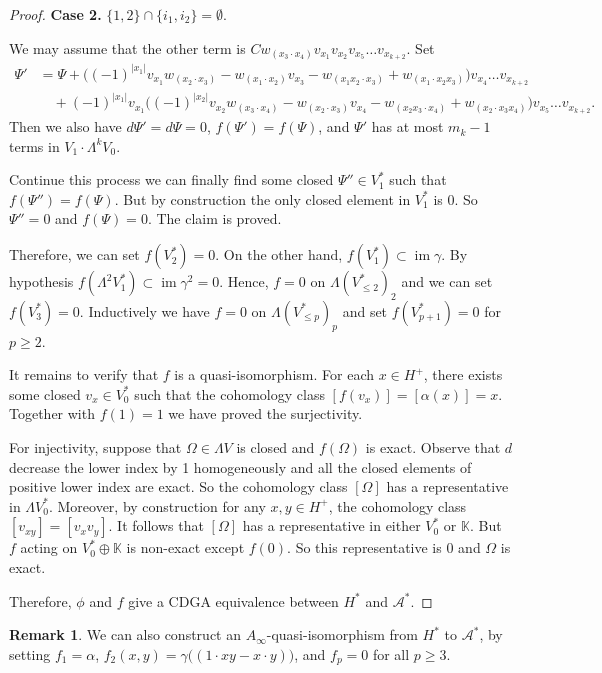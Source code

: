 \documentclass{article}
\theoremstyle{plain}
\theoremstyle{definition}
\newtheorem{rmk}[thm]{Remark}
\theoremstyle{plain}
\DeclareMathOperator{\im}{im}
\numberwithin{equation}{section}
\begin{document}
\begin{proof}
\textbf{Case 2.} $\{1,2\}\cap\{i_1,i_2\}=\emptyset$.

We may assume that the other term is $Cw_{(x_3\cdot x_4)}v_{x_1}v_{x_2}v_{x_5}\ldots v_{x_{k+2}}$. Set
\begin{align*}
\Psi' &= \Psi+\big((-1)^{|x_1|}v_{x_1} w_{({x_2}\cdot {x_3})}-w_{(x_1\cdot x_2)} v_{x_3}-w_{(x_1x_2\cdot x_3)}+w_{(x_1\cdot x_2x_3)}\big)v_{x_4}\ldots v_{x_{k+2}} \\
&\quad +(-1)^{|x_1|}v_{x_1}\big((-1)^{|x_2|}v_{x_2} w_{({x_3}\cdot {x_4})}-w_{(x_2\cdot x_3)} v_{x_4}-w_{(x_2x_3\cdot x_4)}+w_{(x_2\cdot x_3x_4)}\big)v_{x_5}\ldots v_{x_{k+2}}.
\end{align*}
Then we also have $d\Psi'=d\Psi=0$, $f(\Psi')=f(\Psi)$, and $\Psi'$ has at most $m_k-1$ terms in $V_1\cdot\Lambda^k V_0$.

Continue this process we can finally find some closed $\Psi''\in V_1^*$ such that $f(\Psi'')=f(\Psi)$. But by construction the only closed element in $V_1^*$ is 0. So $\Psi''=0$ and $f(\Psi)=0$. The claim is proved.

Therefore, we can set $f(V_2^*)=0$. On the other hand, $f(V_1^*) \subset \im\gamma$. By hypothesis  $f(\Lambda^2 V_1^*)\subset \im\gamma^2=0$. Hence, $f=0$ on $\Lambda(V_{\leq 2}^*)_2$ and we can set $f(V_3^*)=0$. Inductively we have $f=0$ on $\Lambda(V_{\leq p}^*)_p$ and set $f(V_{p+1}^*)=0$ for $p\geq 2$.

It remains to verify that $f$ is a quasi-isomorphism. For each $x\in H^+$, there exists some closed $v_x\in V_0^*$ such that the cohomology class $[f(v_x)]=[\alpha(x)]=x$. Together with $f(1)=1$ we have proved the surjectivity.

For injectivity, suppose that $\Omega\in\Lambda V$ is closed and $f(\Omega)$ is exact. Observe that $d$ decrease the lower index by 1 homogeneously and all the closed elements of positive lower index are exact. So the cohomology class $[\Omega]$ has a representative in $\Lambda V_0^*$. Moreover, by construction for any $x,y\in H^+$, the cohomology class $[v_{xy}]=[v_xv_y]$. It follows that $[\Omega]$ has a representative in either $V_0^*$ or $\mathbb{K}$. But $f$ acting on $V_0^*\oplus\mathbb{K}$ is non-exact except $f(0)$. So this representative is 0 and $\Omega$ is exact.

Therefore, $\phi$ and $f$ give a CDGA equivalence between $H^*$ and $\mathcal{A}^*$. 
\end{proof}

\begin{rmk}
We can also construct an $A_{\infty}$-quasi-isomorphism from $H^*$ to $\mathcal{A}^*$, by setting $f_1=\alpha$, $f_2(x,y)=\gamma\big((1\cdot xy-x\cdot y)\big)$, and $f_p=0$ for all $p\geq 3$.
\end{rmk}
\end{document}
